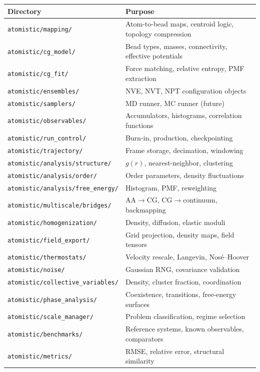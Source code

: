 \documentclass[11pt]{article}
\newcommand{\file}[1]{\texttt{#1}}
\begin{document}
\begin{center}
\begin{tabular}{ll}
\toprule
\textbf{Directory} & \textbf{Purpose} \\
\midrule
\file{atomistic/mapping/} & Atom-to-bead maps, centroid logic, topology compression \\
\file{atomistic/cg\_model/} & Bead types, masses, connectivity, effective potentials \\
\file{atomistic/cg\_fit/} & Force matching, relative entropy, PMF extraction \\
\file{atomistic/ensembles/} & NVE, NVT, NPT configuration objects \\
\file{atomistic/samplers/} & MD runner, MC runner (future) \\
\file{atomistic/observables/} & Accumulators, histograms, correlation functions \\
\file{atomistic/run\_control/} & Burn-in, production, checkpointing \\
\file{atomistic/trajectory/} & Frame storage, decimation, windowing \\
\file{atomistic/analysis/structure/} & $g(r)$, nearest-neighbor, clustering \\
\file{atomistic/analysis/order/} & Order parameters, density fluctuations \\
\file{atomistic/analysis/free\_energy/} & Histogram, PMF, reweighting \\
\file{atomistic/multiscale/bridges/} & AA$\to$CG, CG$\to$continuum, backmapping \\
\file{atomistic/homogenization/} & Density, diffusion, elastic moduli \\
\file{atomistic/field\_export/} & Grid projection, density maps, field tensors \\
\file{atomistic/thermostats/} & Velocity rescale, Langevin, Nos\'{e}--Hoover \\
\file{atomistic/noise/} & Gaussian RNG, covariance validation \\
\file{atomistic/collective\_variables/} & Density, cluster fraction, coordination \\
\file{atomistic/phase\_analysis/} & Coexistence, transitions, free-energy surfaces \\
\file{atomistic/scale\_manager/} & Problem classification, regime selection \\
\file{atomistic/benchmarks/} & Reference systems, known observables, comparators \\
\file{atomistic/metrics/} & RMSE, relative error, structural similarity \\
\bottomrule
\end{tabular}
\end{center}
\end{document}

